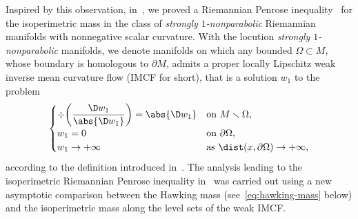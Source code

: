 \documentclass[10pt,a4paper]{amsart}
\numberwithin{equation}{section}
\newcounter{case}
\begin{document}
Inspired by this observation, in~\cite{benatti_isoperimetricriemannianpenroseinequality_2022}, we proved a Riemannian Penrose inequality~\cite{bray_proofriemannianpenroseinequality_2001, huisken_inversemeancurvatureflow_2001} for the isoperimetric mass in the class of \emph{strongly $1$-nonparabolic} Riemannian manifolds with nonnegative scalar curvature. With the locution {\em strongly $1$-nonparabolic} manifolds, we denote manifolds on which any bounded $\Omega \subset M$, whose boundary is homologous to $\partial M$, admits a proper locally Lipschitz weak inverse mean curvature flow (IMCF for short), that is a solution $w_1$ to the problem
\begin{equation}\label{eq:IMCF}
 \begin{cases}
 \div\bigg( \dfrac{ \D w_1}{\abs{\D w_1}}\bigg) = \abs{ \D w_1} & \text{on $M\smallsetminus \Omega$,}\\
 w_1 = 0 & \text{on $\partial \Omega$,}\\
 w_1 \to +\infty & \text{as $\dist(x,\partial \Omega) \to +\infty$},
 \end{cases}
\end{equation}
according to the definition introduced in~\cite{huisken_inversemeancurvatureflow_2001}. The analysis leading to the isoperimetric Riemannian Penrose inequality in~\cite{benatti_isoperimetricriemannianpenroseinequality_2022} was carried out using a new asymptotic comparison between the Hawking mass (see~\eqref{eq:hawking-mass} below) and the isoperimetric mass along the level sets of the weak IMCF.
\end{document}
